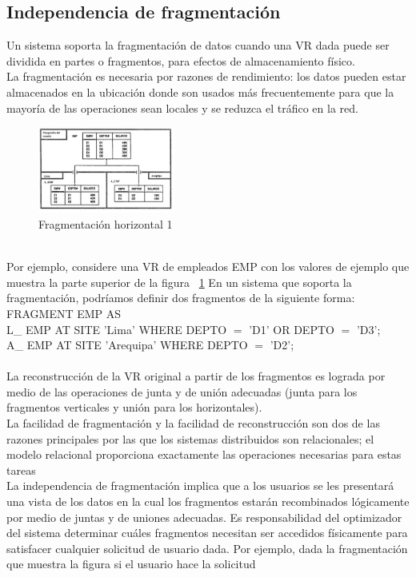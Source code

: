 \documentclass[10pt,a4paper,oneside]{article}
\begin{document}
\begin {itemize}
\subsection{Independencia de fragmentaci\'on}
Un sistema soporta la fragmentaci\'on de datos cuando una VR dada puede ser dividida en partes o fragmentos, para efectos de almacenamiento f\'isico. 
\\La fragmentaci\'on es necesaria por razones de rendimiento: los datos pueden estar almacenados en la ubicaci\'on donde son usados m\'as frecuentemente para que la mayor\'ia de las operaciones sean locales y se reduzca el tr\'afico en la red. 
\begin{figure}[!h]
  \centering
    \includegraphics[width=0.4\textwidth]{fig2}
  \caption{Fragmentaci\'on horizontal 1}
  \label{fig:fig2}
\end{figure}
\\Por ejemplo, considere una VR de empleados EMP con los valores de ejemplo que muestra la parte superior de la figura ~\ref{fig:fig2} En un sistema que soporta la fragmentaci\'on, podr\'iamos definir dos fragmentos de la siguiente forma:
\\FRAGMENT EMP AS
\\L\_ EMP AT SITE 'Lima' WHERE DEPTO $=$ 'D1' OR DEPTO $=$ 'D3';
\\A\_ EMP AT SITE 'Arequipa' WHERE DEPTO $=$ 'D2';
\\\\La reconstrucci\'on de la VR original a partir de los fragmentos es lograda por medio de las operaciones de junta y de uni\'on adecuadas (junta para los fragmentos verticales y uni\'on para los horizontales). 
\\La facilidad de fragmentaci\'on y la facilidad de reconstrucci\'on son dos de las razones principales por las que los sistemas distribuidos son relacionales; el modelo relacional proporciona exactamente las operaciones necesarias para estas tareas 
\\La independencia de fragmentaci\'on implica que a los usuarios se les presentar\'a una vista de los datos en la cual los fragmentos estar\'an recombinados l\'ogicamente por medio de juntas y de uniones adecuadas. Es responsabilidad del optimizador del sistema determinar cu\'ales fragmentos necesitan ser accedidos f\'isicamente para satisfacer cualquier solicitud de usuario dada. Por ejemplo, dada la fragmentaci\'on que muestra la figura si el usuario hace la solicitud

\end{itemize}
\end{document}
